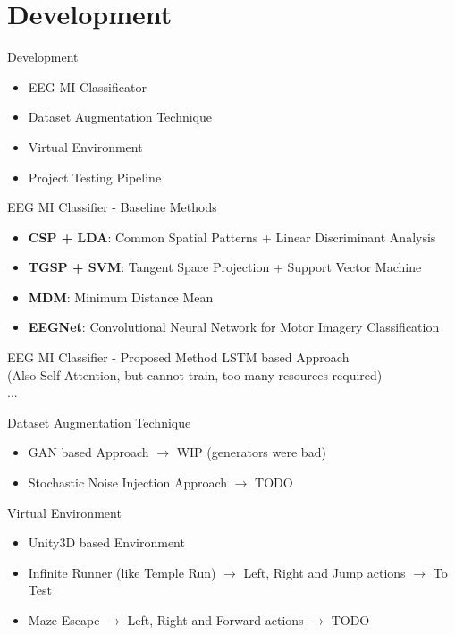 \section{Development}
\begin{frame}{Development}
\begin{itemize}
    \item EEG MI Classificator
    \item Dataset Augmentation Technique
    \item Virtual Environment
    \item Project Testing Pipeline
\end{itemize}
\end{frame}

\begin{frame}{EEG MI Classifier - Baseline Methods}
\begin{itemize}
    \item \textbf{CSP + LDA}: Common Spatial Patterns + Linear Discriminant Analysis
    \item \textbf{TGSP + SVM}: Tangent Space Projection + Support Vector Machine
    \item \textbf{MDM}: Minimum Distance Mean
    \item \textbf{EEGNet}: Convolutional Neural Network for Motor Imagery Classification
\end{itemize}
\end{frame}

\begin{frame}{EEG MI Classifier - Proposed Method}
    LSTM based Approach\\
    (Also Self Attention, but cannot train, too many resources required)\\
    ...
\end{frame}

\begin{frame}{Dataset Augmentation Technique}
    \begin{itemize}
        \item GAN based Approach $\rightarrow{}$ WIP (generators were bad)
        \item Stochastic Noise Injection Approach $\rightarrow{}$ TODO
    \end{itemize}
\end{frame}

\begin{frame}{Virtual Environment}
\begin{itemize}
    \item Unity3D based Environment
    \item Infinite Runner (like Temple Run) $\rightarrow{}$ Left, Right and Jump actions $\rightarrow{}$ To Test
    \item Maze Escape $\rightarrow{}$ Left, Right and Forward actions $\rightarrow{}$ TODO
\end{itemize}
\end{frame}

